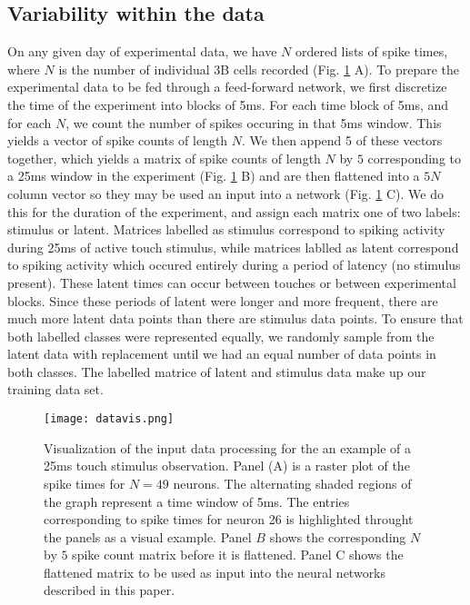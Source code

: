 \documentclass[12pt]{article}
\begin{document}
\subsection{Variability within the data}
\indent On any given day of experimental data, we have $N$ ordered lists of spike times, where $N$ is the number of individual 3B cells recorded (Fig. \ref{fig:datavis} A). To prepare the experimental data to be fed through a feed-forward network, we first discretize the time of the experiment into blocks of 5ms. For each time block of 5ms, and for each $N$, we count the number of spikes occuring in that 5ms window. This yields a vector of spike counts of length $N$. We then append 5 of these vectors together, which yields a matrix of spike counts of length $N$ by $5$  corresponding to a 25ms window in the experiment (Fig. \ref{fig:datavis} B) and are then flattened into a $5N$ column vector so they may be used an input into a network (Fig. \ref{fig:datavis} C). We do this for the duration of the experiment, and assign each matrix one of two labels: stimulus or latent. Matrices labelled as stimulus correspond to spiking activity during 25ms of active touch stimulus, while matrices lablled as latent correspond to spiking activity which occured entirely during a period of latency (no stimulus present). These latent times can occur between touches or between experimental blocks. Since these periods of latent were longer and more frequent, there are much more latent data points than there are stimulus data points. To ensure that both labelled classes were represented equally, we randomly sample from the latent data with replacement until we had an equal number of data points in both classes. The labelled matrice of latent and stimulus data make up our training data set. \\
\begin{figure}
  \centering
  \texttt{[image: datavis.png]}
  \caption{Visualization of the input data processing for the an example of a 25ms touch stimulus observation. Panel (A) is a raster plot of the spike times for $N=49$ neurons. The alternating shaded regions of the graph represent a time window of 5ms. The entries corresponding to spike times for neuron 26 is highlighted throught the panels as a visual example. Panel $B$ shows the corresponding $N$ by $5$ spike count matrix before it is flattened. Panel C shows the flattened matrix to be used as input into the neural networks described in this paper. }
  \label{fig:datavis}
\end{figure}
\end{document}
